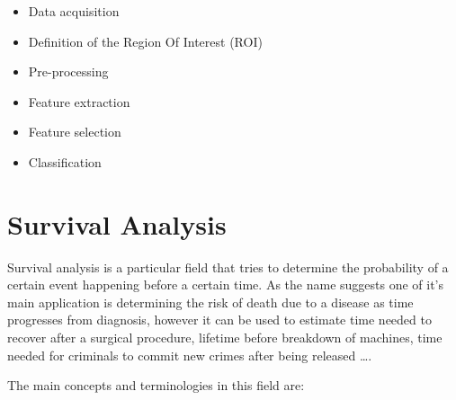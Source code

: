 \begin{itemize}
\item Data acquisition
\item Definition of the Region Of Interest (ROI)
\item Pre-processing
\item Feature extraction
\item Feature selection
\item Classification
\end{itemize}

\section{Survival Analysis}\label{sec:SurvivalAnalysisTheory}
Survival analysis is a particular field that tries to determine the probability of a certain event happening before a certain time.
As the name suggests one of it's main application is determining the risk of death due to a disease as time progresses from diagnosis, however it can be used to estimate time needed to recover after a surgical procedure, lifetime before breakdown of machines, time needed for criminals to commit new crimes after being released \ldots. 

The main concepts and terminologies in this field are:

